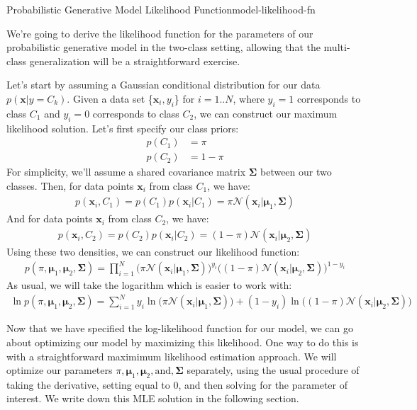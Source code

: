 \begin{derivation}{Probabilistic Generative Model Likelihood Function}{model-likelihood-fn}

    We're going to derive the likelihood function for the parameters of our probabilistic generative model in the two-class setting, allowing that the multi-class generalization will be a straightforward exercise.

    Let's start by assuming a Gaussian conditional distribution for our data $p(\textbf{x} | y = C_{k})$. Given a data set \{$\textbf{x}_{i}, y_{i}$\} for $i = 1..N$, where $y_{i} = 1$ corresponds to class $C_{1}$ and $y_{i} = 0$ corresponds to class $C_{2}$, we can construct our maximum likelihood solution. Let's first specify our class priors:
    \begin{align*}
    	p(C_{1}) &= \pi \\
    	p(C_{2}) &= 1 - \pi
    \end{align*}
    For simplicity, we'll assume a shared covariance matrix $\boldsymbol{\Sigma}$ between our two classes. Then, for data points $\textbf{x}_{i}$ from class $C_{1}$, we have:
    \begin{align*}
    	p(\textbf{x}_{i}, C_{1}) = p(C_{1})p(\textbf{x}_{i}|C_{1}) = \pi\mathcal{N}(\textbf{x}_{i} | \boldsymbol{\mu}_{1}, \boldsymbol{\Sigma})
    \end{align*}
    And for data points $\textbf{x}_{i}$ from class $C_{2}$, we have:
    \begin{align*}
    	p(\textbf{x}_{i}, C_{2}) = p(C_{2})p(\textbf{x}_{i}|C_{2}) = (1-\pi)\mathcal{N}(\textbf{x}_{i} | \boldsymbol{\mu}_{2}, \boldsymbol{\Sigma})
    \end{align*}
    Using these two densities, we can construct our likelihood function:
    \begin{align*}
    	p(\pi, \boldsymbol{\mu}_{1}, \boldsymbol{\mu}_{2}, \boldsymbol{\Sigma}) = \prod_{i=1}^{N} \bigg( \pi\mathcal{N}(\textbf{x}_{i} | \boldsymbol{\mu}_{1}, \boldsymbol{\Sigma}) \bigg)^{y_{i}} \bigg( (1-\pi)\mathcal{N}(\textbf{x}_{i} | \boldsymbol{\mu}_{2}, \boldsymbol{\Sigma}) \bigg)^{1 - y_{i}}
    \end{align*}
    As usual, we will take the logarithm which is easier to work with:
    \begin{align*}
    	\ln p(\pi, \boldsymbol{\mu}_{1}, \boldsymbol{\mu}_{2}, \boldsymbol{\Sigma}) = \sum_{i=1}^{N} y_{i} \ln \bigg( \pi\mathcal{N}(\textbf{x}_{i} | \boldsymbol{\mu}_{1}, \boldsymbol{\Sigma}) \bigg) + (1 - y_{i}) \ln \bigg( (1-\pi)\mathcal{N}(\textbf{x}_{i} | \boldsymbol{\mu}_{2}, \boldsymbol{\Sigma}) \bigg)
    \end{align*}
\end{derivation}
Now that we have specified the log-likelihood function for our model, we can go about optimizing our model by maximizing this likelihood. One way to do this is with a straightforward maximimum likelihood estimation approach. We will optimize our parameters $\pi, \boldsymbol{\mu}_{1}, \boldsymbol{\mu}_{2}, \text{and}, \boldsymbol{\Sigma}$ separately, using the usual procedure of taking the derivative, setting equal to 0, and then solving for the parameter of interest. We write down this MLE solution in the following section.

